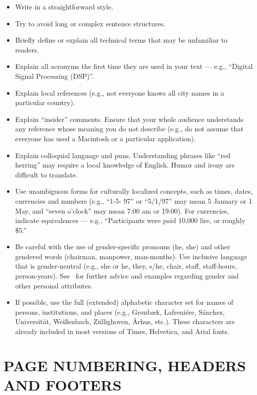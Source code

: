 \documentclass{chi2012}
\begin{document}
\begin{itemize}
\item Write in a straightforward style.
\item Try to avoid long or complex sentence structures.
\item Briefly define or explain all technical terms that may be
  unfamiliar to readers.
\item Explain all acronyms the first time they are used in your text
  --- e.g., ``Digital Signal Processing (DSP)''.
\item Explain local references (e.g., not everyone knows all city
  names in a particular country).
\item Explain ``insider'' comments. Ensure that your whole audience
  understands any reference whose meaning you do not describe (e.g.,
  do not assume that everyone has used a Macintosh or a particular
  application).
\item Explain colloquial language and puns. Understanding phrases like
  ``red herring'' may require a local knowledge of English.  Humor and
  irony are difficult to translate.
\item Use unambiguous forms for culturally localized concepts, such as
  times, dates, currencies and numbers (e.g., ``1-5- 97'' or ``5/1/97''
  may mean 5 January or 1 May, and ``seven o'clock'' may mean 7:00 am or
  19:00).  For currencies, indicate equivalences --- e.g., ``Participants
  were paid 10,000 lire, or roughly \$5.''
\item Be careful with the use of gender-specific pronouns (he, she)
  and other gendered words (chairman, manpower, man-months). Use
  inclusive language that is gender-neutral (e.g., she or he, they,
  s/he, chair, staff, staff-hours,
  person-years). See~\cite{Schwartz:1995:GBF} for further advice and
  examples regarding gender and other personal attributes.
\item If possible, use the full (extended) alphabetic character set
  for names of persons, institutions, and places (e.g.,
  Gr{\o}nb{\ae}k, Lafreni\'ere, S\'anchez, Universit{\"a}t,
  Wei{\ss}enbach, Z{\"u}llighoven, \r{A}rhus, etc.).  These characters
  are already included in most versions of Times, Helvetica, and Arial
  fonts.
\end{itemize}

\section{PAGE NUMBERING, HEADERS AND FOOTERS}
\end{document}
